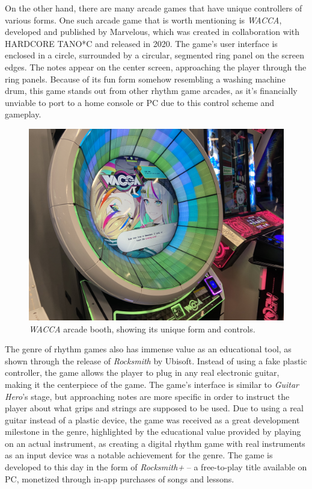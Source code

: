 On the other hand, there are many arcade games that have unique controllers of various forms. One such arcade game that is worth mentioning is \textit{WACCA}, developed and published by Marvelous, which was created in collaboration with HARDCORE TANO*C and released in 2020. The game’s user interface is enclosed in a circle, surrounded by a circular, segmented ring panel on the screen edges. The notes appear on the center screen, approaching the player through the ring panels. Because of its fun form somehow resembling a washing machine drum, this game stands out from other rhythm game arcades, as it’s financially unviable to port to a home console or PC due to this control scheme and gameplay.

\begin{figure}[h]
    \centering\includegraphics[scale=0.1]{obrazki/waccaarcade.jpg}
    \caption{\textit{WACCA} arcade booth, showing its unique form and controls. \cite{waccaarcade}}
    \label{fig:wacca_arcade}
\end{figure}

The genre of rhythm games also has immense value as an educational tool, as shown through the release of \textit{Rocksmith} by Ubisoft. Instead of using a fake plastic controller, the game allows the player to plug in any real electronic guitar, making it the centerpiece of the game. The game’s interface is similar to \textit{Guitar Hero}’s stage, but approaching notes are more specific in order to instruct the player about what grips and strings are supposed to be used. Due to using a real guitar instead of a plastic device, the game was received as a great development milestone in the genre, highlighted by the educational value provided by playing on an actual instrument, as creating a digital rhythm game with real instruments as an input device was a notable achievement for the genre. The game is developed to this day in the form of \textit{Rocksmith+} -- a free-to-play title available on PC, monetized through in-app purchases of songs and lessons.

